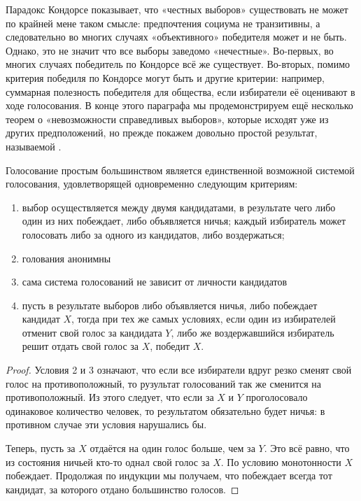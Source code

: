 Парадокс Кондорсе показывает, что «честных выборов» существовать не может по крайней мене таком смысле: предпочтения социума не транзитивны, а следовательно во многих случаях «объективного» победителя может и не быть. Однако, это не значит что все выборы заведомо «нечестные». Во-первых, во многих случаях победитель по Кондорсе всё же существует. Во-вторых, помимо критерия победиля по Кондорсе могут быть и другие критерии: например, суммарная полезность победителя для общества, если избиратели её оценивают в ходе голосования. В конце этого параграфа мы продемонстрируем ещё несколько теорем о «невозможности справедливых выборов», которые исходят уже из других предположений, но прежде покажем довольно простой результат, называемой .

\begin{thm}
Голосование простым большинством является единственной возможной системой голосования, удовлетворящей одновременно следующим критериям:
\begin{enumerate}
\item выбор осуществляется между двумя кандидатами, в результате чего либо один из них побеждает, либо объявляется ничья; каждый избиратель может голосовать либо за одного из кандидатов, либо воздержаться;
\item голования анонимны
\item сама система голосований не зависит от личности кандидатов
\item пусть в результате выборов либо объявляется ничья, либо побеждает кандидат $X$, тогда при тех же самых условиях, если один из избирателей отменит свой голос за кандидата $Y$, либо же воздержавшийся избиратель решит отдать свой голос за $X$, победит $X$.
\end{enumerate}
\end{thm}
\begin{proof}
Условия 2 и 3 означают, что если все избиратели вдруг резко сменят свой голос на противоположный, то рузультат голосований так же сменится на противоположный. Из этого следует, что если за $X$ и $Y$ проголосовало одинаковое количество человек, то результатом обязательно будет ничья: в противном случае эти условия нарушались бы.

Теперь, пусть за $X$ отдаётся на один голос больше, чем за $Y$. Это всё равно, что из состояния ничьей кто-то однал свой голос за $X$. По условию монотонности $X$ побеждает. Продолжая по индукции мы получаем, что побеждает всегда тот кандидат, за которого отдано большинство голосов.
\end{proof}

